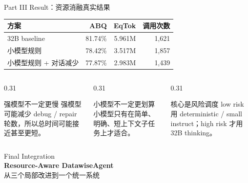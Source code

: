 \documentclass[aspectratio=169,UTF8]{ctexbeamer}
\newcommand{\chip}[1]{\begingroup\setlength{\fboxsep}{2pt}\colorbox{DWBlue!10}{\scriptsize\textcolor{DWBlue}{#1}}\endgroup}
\newcommand{\parttitle}[3]{%
  \begin{frame}[plain]
    \vspace{1.4em}
    \begin{center}
      \chip{#1}\\[1.0em]
      {\Huge\textbf{#2}}\\[0.7em]
      {\large #3}
    \end{center}
  \end{frame}
}
\begin{document}
\begin{frame}{Part III Result：资源消融真实结果}
\footnotesize
\begin{center}
\begin{tabularx}{0.88\textwidth}{X r r r}
\toprule
方案 & ABQ & EqTok & 调用次数 \\
\midrule
32B baseline & 81.74\% & 5.961M & 1,621 \\
小模型规则 & 78.42\% & 3.517M & 1,857 \\
小模型规则 + 对话减少 & 77.87\% & 2.983M & 1,439 \\
\bottomrule
\end{tabularx}
\end{center}
\vspace{0.65em}
\begin{columns}[T]
\begin{column}{0.31\textwidth}
\begin{block}{强模型不一定更慢}
强模型可能减少 debug / repair 轮数，所以总时间可能接近甚至更短。
\end{block}
\end{column}
\begin{column}{0.31\textwidth}
\begin{block}{小模型不一定更划算}
小模型只有在简单、明确、短上下文子任务上才适合。
\end{block}
\end{column}
\begin{column}{0.31\textwidth}
\begin{block}{核心是风险调度}
low risk 用 deterministic / small instruct；high risk 才用 32B thinking。
\end{block}
\end{column}
\end{columns}
\end{frame}

\parttitle{Final Integration}{Resource-Aware DatawiseAgent}{从三个局部改进到一个统一系统}
\end{document}
